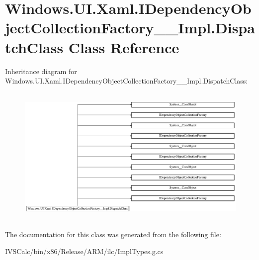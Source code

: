\hypertarget{class_windows_1_1_u_i_1_1_xaml_1_1_i_dependency_object_collection_factory_____impl_1_1_dispatch_class}{}\section{Windows.\+U\+I.\+Xaml.\+I\+Dependency\+Object\+Collection\+Factory\+\_\+\+\_\+\+Impl.\+Dispatch\+Class Class Reference}
\label{class_windows_1_1_u_i_1_1_xaml_1_1_i_dependency_object_collection_factory_____impl_1_1_dispatch_class}
Inheritance diagram for Windows.\+U\+I.\+Xaml.\+I\+Dependency\+Object\+Collection\+Factory\+\_\+\+\_\+\+Impl.\+Dispatch\+Class\+:\begin{figure}[H]
\begin{center}
\leavevmode
\includegraphics[height=6.799117cm]{class_windows_1_1_u_i_1_1_xaml_1_1_i_dependency_object_collection_factory_____impl_1_1_dispatch_class}
\end{center}
\end{figure}


The documentation for this class was generated from the following file\+:\begin{DoxyCompactItemize}
\item 
I\+V\+S\+Calc/bin/x86/\+Release/\+A\+R\+M/ilc/Impl\+Types.\+g.\+cs\end{DoxyCompactItemize}
